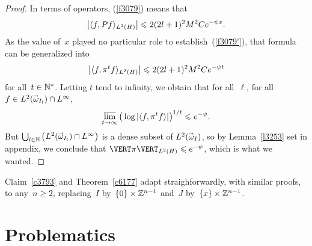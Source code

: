 \begin{proof}
In terms of operators, (\ref{f3079}) means that
\[\label{f3079'} \big|\langle f, Pf \rangle_{\ldb(H)}\big| \leq 2(2\ell+1)^2M^2Ce^{-\psi x} .\]
As the value of~$x$ played no particular role to establish~(\ref{f3079'}),
that formula can be generalized
into
\[ \big|\langle f, \pi^t f \rangle_{\ldb(H)}\big| \leq 2(2\ell+1)^2M^2 C e^{-\psi t} \]
for all~$t\in\mathbb{N}^*$.
Letting $t$ tend to infinity, we obtain that for all~$\ell$,
for all~$f\in\ldb(\vec\omega_{I_\ell}) \cap L^\infty$,
\[ \limsup_{t\longto\infty} \big( \ln |\langle f, \pi^t f \rangle| \big)^{1/t} \leq e^{-\psi} .\]
But $\bigcup_{\ell\in\NN} \big(\ldb(\vec\omega_{I_\ell})\cap L^\infty\big)$ is a dense subset of
$\ldb(\vec\omega_I)$, so by Lemma~\ref{l3253} set in appendix,
we conclude that $\VERT \pi \VERT_{\ldb(H)} \leq e^{-\psi}$, which is what we wanted.
\end{proof}

\begin{Rmk}
Claim~\ref{c3793} and Theorem~\ref{c6177} adapt straighforwardly,
with similar proofs, to any~$n\geq2$,
replacing~$I$ by~$\{0\}\times\mathbb{Z}^{n-1}$ and~$J$ by~$\{x\}\times\mathbb{Z}^{n-1}$.
\end{Rmk}



\section{Problematics}\label{parProblematics}

